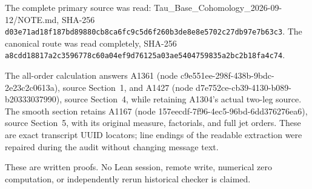 The complete primary source was read: Tau\_Base\_Cohomology\_2026-09-12/NOTE.md, SHA-256 \nolinkurl{d03e71ad18f187bd89880cb8ca6fc9c5d6f260b3de8e8e5702c27db97e7b63c3}. The canonical route was read completely, SHA-256 \nolinkurl{a8cdd18817a2c3596778c60a04ef9d76125a03ae5404759835a2bc2b18fa4c74}.

The all-order calculation answers A1361 (node c9e551ee-298f-438b-9bdc-2e23c2c0613a), source Section~1, and A1427 (node d7e752ce-cb39-4130-b089-b20333037990), source Section~4, while retaining A1304's actual two-leg source. The smooth section retains A1167 (node 157eecdf-7f96-4ec5-96bd-6dd376276ea6), source Section~5, with its original measure, factorials, and full jet orders. These are exact transcript UUID locators; line endings of the readable extraction were repaired during the audit without changing message text.

These are written proofs. No Lean session, remote write, numerical zero computation, or independently rerun historical checker is claimed.
